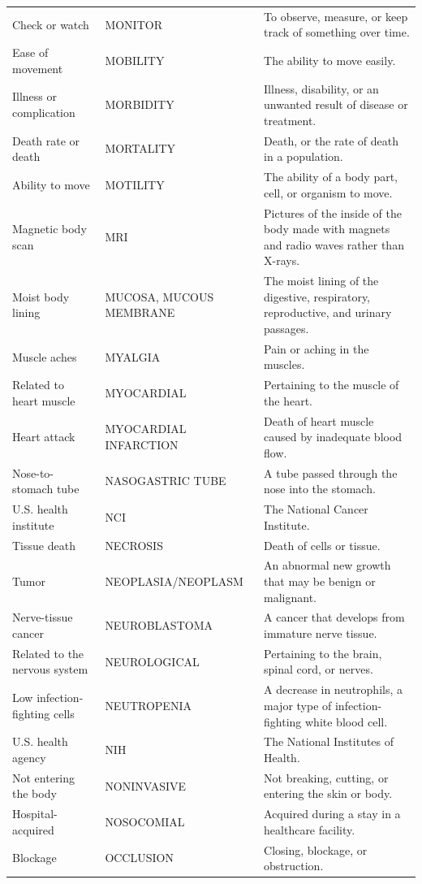 \begin{longtable}{>{\raggedright\arraybackslash}p{} >{\raggedright\arraybackslash}p{} >{\raggedright\arraybackslash}p{}}
Check or watch & MONITOR & To observe, measure, or keep track of something over time. \\
Ease of movement & MOBILITY & The ability to move easily. \\
Illness or complication & MORBIDITY & Illness, disability, or an unwanted result of disease or treatment. \\
Death rate or death & MORTALITY & Death, or the rate of death in a population. \\
Ability to move & MOTILITY & The ability of a body part, cell, or organism to move. \\
Magnetic body scan & MRI & Pictures of the inside of the body made with magnets and radio waves rather than X-rays. \\
Moist body lining & MUCOSA, MUCOUS MEMBRANE & The moist lining of the digestive, respiratory, reproductive, and urinary passages. \\
Muscle aches & MYALGIA & Pain or aching in the muscles. \\
Related to heart muscle & MYOCARDIAL & Pertaining to the muscle of the heart. \\
Heart attack & MYOCARDIAL INFARCTION & Death of heart muscle caused by inadequate blood flow. \\
Nose-to-stomach tube & NASOGASTRIC TUBE & A tube passed through the nose into the stomach. \\
U.S. health institute & NCI & The National Cancer Institute. \\
Tissue death & NECROSIS & Death of cells or tissue. \\
Tumor & NEOPLASIA/NEOPLASM & An abnormal new growth that may be benign or malignant. \\
Nerve-tissue cancer & NEUROBLASTOMA & A cancer that develops from immature nerve tissue. \\
Related to the nervous system & NEUROLOGICAL & Pertaining to the brain, spinal cord, or nerves. \\
Low infection-fighting cells & NEUTROPENIA & A decrease in neutrophils, a major type of infection-fighting white blood cell. \\
U.S. health agency & NIH & The National Institutes of Health. \\
Not entering the body & NONINVASIVE & Not breaking, cutting, or entering the skin or body. \\
Hospital-acquired & NOSOCOMIAL & Acquired during a stay in a healthcare facility. \\
Blockage & OCCLUSION & Closing, blockage, or obstruction. \\

\end{longtable}
